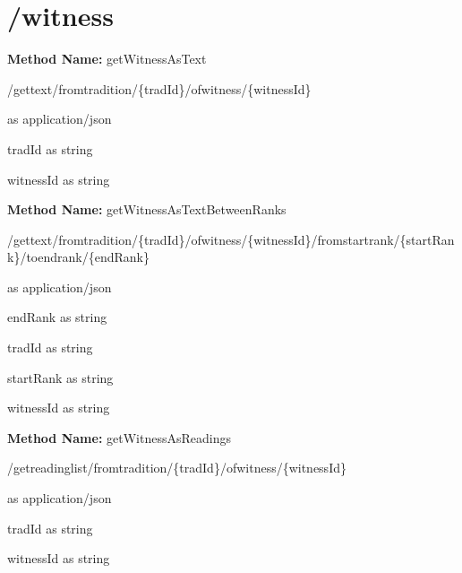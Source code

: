 \section{/witness}
\textbf{Method Name: }getWitnessAsText
\begin{get}
/gettext/fromtradition/\{tradId\}/ofwitness/\{witnessId\}
\end{get}
\begin{response}
 as application/json
\end{response}
\begin{parameter}
tradId as string
\end{parameter}
\begin{parameter}
witnessId as string
\end{parameter}
\textbf{Method Name: }getWitnessAsTextBetweenRanks
\begin{get}
/gettext/fromtradition/\{tradId\}/ofwitness/\{witnessId\}/fromstartrank/\{startRank\}/toendrank/\{endRank\}
\end{get}
\begin{response}
 as application/json
\end{response}
\begin{parameter}
endRank as string
\end{parameter}
\begin{parameter}
tradId as string
\end{parameter}
\begin{parameter}
startRank as string
\end{parameter}
\begin{parameter}
witnessId as string
\end{parameter}
\textbf{Method Name: }getWitnessAsReadings
\begin{get}
/getreadinglist/fromtradition/\{tradId\}/ofwitness/\{witnessId\}
\end{get}
\begin{response}
 as application/json
\end{response}
\begin{parameter}
tradId as string
\end{parameter}
\begin{parameter}
witnessId as string
\end{parameter}
